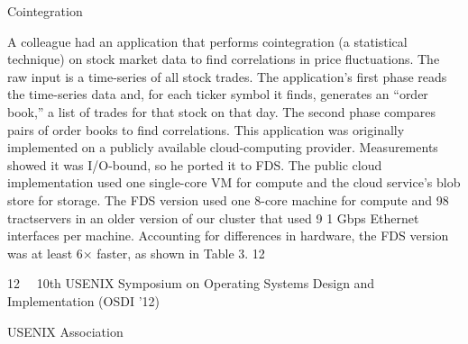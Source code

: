 Cointegration

A colleague had an application that performs cointegration (a statistical technique) on stock market data to
find correlations in price fluctuations. The raw input is
a time-series of all stock trades. The application’s first
phase reads the time-series data and, for each ticker symbol it finds, generates an “order book,” a list of trades for
that stock on that day. The second phase compares pairs
of order books to find correlations.
This application was originally implemented on a publicly available cloud-computing provider. Measurements
showed it was I/O-bound, so he ported it to FDS. The
public cloud implementation used one single-core VM
for compute and the cloud service’s blob store for storage. The FDS version used one 8-core machine for compute and 98 tractservers in an older version of our cluster
that used 9 1 Gbps Ethernet interfaces per machine. Accounting for differences in hardware, the FDS version
was at least 6× faster, as shown in Table 3.
12

12  10th USENIX Symposium on Operating Systems Design and Implementation (OSDI ’12) 

USENIX Association


